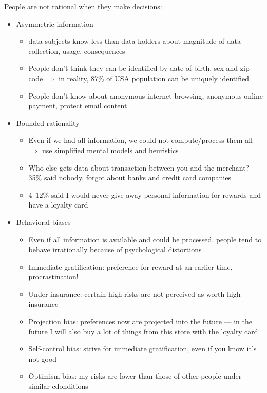\documentclass[a4paper,12pt]{scrartcl}
\begin{document}
\begin{itemize}
		People are not rational when they make decisions:
		\begin{itemize}
			\item
				Asymmetric information
				\begin{itemize}
					\item
						data subjects know less than data holders about magnitude of data collection, usage, consequences
					\item
						People don't think they can be identified by date of birth, sex and zip code $\Rightarrow$ in reality, 87\% of USA population can be uniquely identified
					\item
						People don't know about anonymous internet browsing, anonymous online payment, protect email content
				\end{itemize}
			\item
				Bounded rationality
				\begin{itemize}
					\item
						Even if we had all information, we could not compute/process them all $\Rightarrow$ use simplified mental models and heuristics
					\item
						Who else gets data about transaction between you and the merchant? 35\% said nobody, forgot about banks and credit card companies
					\item
						4--12\% said I would never give away personal information for rewards and have a loyalty card
				\end{itemize}
			\item
				Behavioral biases
				\begin{itemize}
					\item
						Even if all information is available and could be processed, people tend to behave irrationally because of psychological distortions
					\item
						Immediate gratification: preference for reward at an earlier time, procrastination!
					\item
						Under insurance: certain high risks are not perceived as worth high insurance
					\item
						Projection bias: preferences now are projected into the future --- in the future I will also buy a lot of things from this store with the loyalty card
					\item
						Self-control bias: strive for immediate gratification, even if you know it's not good
					\item
						Optimism bias: my risks are lower than those of other people under similar cdonditions

\end{itemize}
\end{itemize}
\end{itemize}
\end{document}
